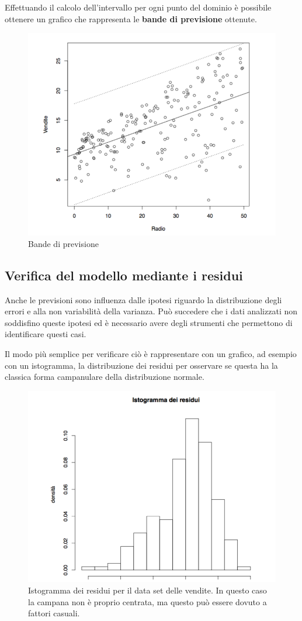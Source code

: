 Effettuando il calcolo dell'intervallo per ogni punto del dominio è possibile ottenere un grafico che rappresenta le \textbf{bande di previsione} ottenute.

\begin{figure}[htbp]
\centering
\includegraphics[width=.6\textwidth]{./notes/immagini/l6-fig10-1.png}
\caption{Bande di previsione}
\end{figure}

\subsection{Verifica del modello mediante i residui}

Anche le previsioni sono influenza dalle ipotesi riguardo la distribuzione degli errori e alla non variabilità della varianza.
Può succedere che i dati analizzati non soddisfino queste ipotesi ed è necessario avere degli strumenti che permettono di identificare questi casi.

Il modo più semplice per verificare ciò è rappresentare con un grafico, ad esempio con un istogramma, la distribuzione dei residui per osservare se questa ha la classica forma campanulare della distribuzione normale.

\begin{figure}[htbp]
\centering
\includegraphics[width=.6\textwidth]{./notes/immagini/l6-fig11-1.png}
\caption{Istogramma dei residui per il data set delle vendite. In questo caso la campana non è proprio centrata, ma questo può essere dovuto a fattori casuali.}
\end{figure}

